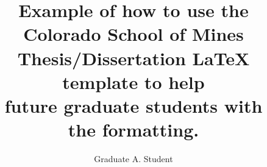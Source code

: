 \documentclass{article}
\begin{document}

\title{
    Example of how to use the Colorado School of Mines\\
    Thesis/Dissertation \LaTeX{} template to help\\
    future graduate students with\\
    the formatting.
    }


\author{Graduate A. Student}        %
\end{document}
